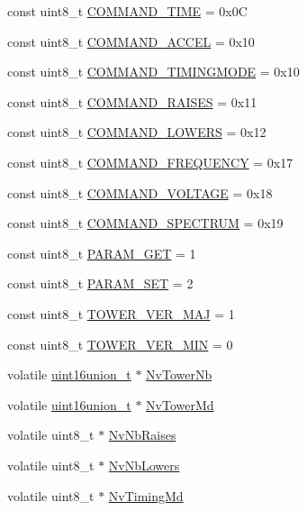 \begin{DoxyCompactItemize}
\item 
const uint8\+\_\+t \hyperlink{group__main__module_gadf65892e5f80346910401e203bb4055e}{C\+O\+M\+M\+A\+N\+D\+\_\+\+T\+I\+M\+E} = 0x0\+C
\item 
const uint8\+\_\+t \hyperlink{group__main__module_ga2fc0a6886900e1e4df19015cb14cbcbd}{C\+O\+M\+M\+A\+N\+D\+\_\+\+A\+C\+C\+E\+L} = 0x10
\item 
const uint8\+\_\+t \hyperlink{group__main__module_gaf002f78f32e71bac2a8ffd7b916c23c7}{C\+O\+M\+M\+A\+N\+D\+\_\+\+T\+I\+M\+I\+N\+G\+M\+O\+D\+E} = 0x10
\item 
const uint8\+\_\+t \hyperlink{group__main__module_ga458112a297f29bcedf862af9fee21352}{C\+O\+M\+M\+A\+N\+D\+\_\+\+R\+A\+I\+S\+E\+S} = 0x11
\item 
const uint8\+\_\+t \hyperlink{group__main__module_ga3950ac4d5a4f4c540f6856a4ad463e14}{C\+O\+M\+M\+A\+N\+D\+\_\+\+L\+O\+W\+E\+R\+S} = 0x12
\item 
const uint8\+\_\+t \hyperlink{group__main__module_gad03f9b44ebc48c9db63337935fcaf46e}{C\+O\+M\+M\+A\+N\+D\+\_\+\+F\+R\+E\+Q\+U\+E\+N\+C\+Y} = 0x17
\item 
const uint8\+\_\+t \hyperlink{group__main__module_ga793f5eac55477efb909e878b3021f765}{C\+O\+M\+M\+A\+N\+D\+\_\+\+V\+O\+L\+T\+A\+G\+E} = 0x18
\item 
const uint8\+\_\+t \hyperlink{group__main__module_gae55bd8263a510b359f8b4ebca3e6a91d}{C\+O\+M\+M\+A\+N\+D\+\_\+\+S\+P\+E\+C\+T\+R\+U\+M} = 0x19
\item 
const uint8\+\_\+t \hyperlink{group__main__module_ga590be3fd131777c613188298af1d7ebe}{P\+A\+R\+A\+M\+\_\+\+G\+E\+T} = 1
\item 
const uint8\+\_\+t \hyperlink{group__main__module_gadd09d8fcbae69002598b43a17fe09566}{P\+A\+R\+A\+M\+\_\+\+S\+E\+T} = 2
\item 
const uint8\+\_\+t \hyperlink{group__main__module_gaf7a418e92b8fc61e43bd6a4b55e308f2}{T\+O\+W\+E\+R\+\_\+\+V\+E\+R\+\_\+\+M\+A\+J} = 1
\item 
const uint8\+\_\+t \hyperlink{group__main__module_ga4cb61e8ce9aecb8cc246efa06637d082}{T\+O\+W\+E\+R\+\_\+\+V\+E\+R\+\_\+\+M\+I\+N} = 0
\item 
volatile \hyperlink{unionuint16union__t}{uint16union\+\_\+t} $\ast$ \hyperlink{group__main__module_ga65fc76be2b0895efd0e3ba05ce041c8b}{Nv\+Tower\+Nb}
\item 
volatile \hyperlink{unionuint16union__t}{uint16union\+\_\+t} $\ast$ \hyperlink{group__main__module_ga34f4a2041161f5c8cda7808c766d53d0}{Nv\+Tower\+Md}
\item 
volatile uint8\+\_\+t $\ast$ \hyperlink{group__main__module_ga238e81a23614407f664e73f8a3d0b7fe}{Nv\+Nb\+Raises}
\item 
volatile uint8\+\_\+t $\ast$ \hyperlink{group__main__module_ga06256289e4edfe7e871779cd6c059053}{Nv\+Nb\+Lowers}
\item 
volatile uint8\+\_\+t $\ast$ \hyperlink{group__main__module_ga574579db7eb4f4ab648d318e638fd615}{Nv\+Timing\+Md}
\end{DoxyCompactItemize}


